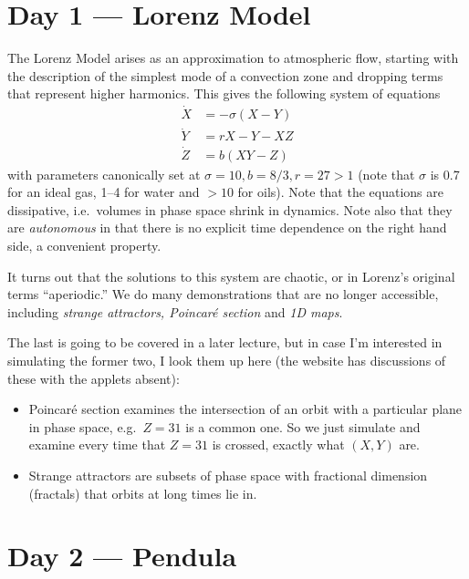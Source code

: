 \documentclass[10pt]{article}
\begin{document}
\pagestyle{fancy}
\cfoot{\thepage/\pageref{LastPage}}

\tableofcontents
\clearpage

\section{Day 1 --- Lorenz Model}

The Lorenz Model arises as an approximation to atmospheric flow, starting with the description of the simplest mode of a convection zone and dropping terms that represent higher harmonics. This gives the following system of equations
\begin{align}
    \dot{X} &= -\sigma(X - Y) \nonumber\\
    \dot{Y} &= rX - Y - XZ \nonumber\\
    \dot{Z} &= b(XY - Z)
\end{align}
with parameters canonically set at $\sigma = 10, b = 8/3, r =27 > 1$ (note that $\sigma$ is 0.7 for an ideal gas, 1--4 for water and $>10$ for oils). Note that the equations are dissipative, i.e.\ volumes in phase space shrink in dynamics. Note also that they are \emph{autonomous} in that there is no explicit time dependence on the right hand side, a convenient property.

It turns out that the solutions to this system are chaotic, or in Lorenz's original terms ``aperiodic.'' We do many demonstrations that are no longer accessible, including \emph{strange attractors, Poincar\'e section} and \emph{1D maps}.

The last is going to be covered in a later lecture, but in case I'm interested in simulating the former two, I look them up here (the website has discussions of these with the applets absent):
\begin{itemize}
    \item Poincar\'e section examines the intersection of an orbit with a particular plane in phase space, e.g.\ $Z=31$ is a common one. So we just simulate and examine every time that $Z=31$ is crossed, exactly what $(X,Y)$ are.
    \item Strange attractors are subsets of phase space with fractional dimension (fractals) that orbits at long times lie in.
\end{itemize}

\section{Day 2 --- Pendula}
\end{document}

